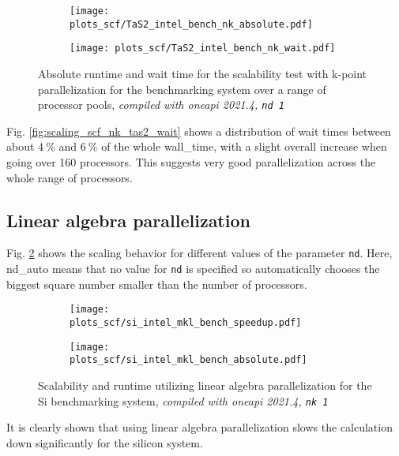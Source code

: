 \documentclass[main.tex]{subfiles}
\begin{document}
\begin{figure}[ht!]
    \begin{subfigure}[b]{0.49\textwidth}
        \centering
        \texttt{[image: plots\_scf/TaS2\_intel\_bench\_nk\_absolute.pdf]}
    \end{subfigure}
    \begin{subfigure}[b]{0.49\textwidth}
        \centering
        \texttt{[image: plots\_scf/TaS2\_intel\_bench\_nk\_wait.pdf]}
    \end{subfigure}
    \caption{Absolute runtime and wait time for the scalability test with k-point parallelization for the \TaS benchmarking system over a range of processor pools, \emph{\QE compiled with \gls{oneapi} 2021.4, \texttt{nd 1}}}
    \label{fig:scaling_scf_nk_tas2_absolute_wait}
\end{figure}
Fig. \ref{fig:scaling_scf_nk_tas2_wait} shows a distribution of wait times between about \(\SI{4}{\percent}\) and \(\SI{6}{\percent}\) of the whole \gls{wall_time}, with a slight overall increase when going over 160 processors.
This suggests very good parallelization across the whole range of processors.


\subsection{Linear algebra parallelization}

Fig. \ref{fig:scaling_scf_nd_si} shows the scaling behavior for different values of the parameter \texttt{nd}.
Here, nd\_auto means that no value for \texttt{nd} is specified so \QE automatically chooses the biggest square number smaller than the number of processors.
\begin{figure}[ht!]
\begin{subfigure}[b]{0.49\textwidth}
    \centering
    \texttt{[image: plots\_scf/si\_intel\_mkl\_bench\_speedup.pdf]}
\end{subfigure}
\begin{subfigure}[b]{0.49\textwidth}
    \centering
    \texttt{[image: plots\_scf/si\_intel\_mkl\_bench\_absolute.pdf]}
\end{subfigure}
\label{fig:scaling_scf_nd_si}
\caption{Scalability and runtime utilizing linear algebra parallelization for the Si benchmarking system, \emph{\QE compiled with \gls{oneapi} 2021.4, \texttt{nk 1}}}
\end{figure}
It is clearly shown that using linear algebra parallelization slows the calculation down significantly for the silicon system.
\end{document}
